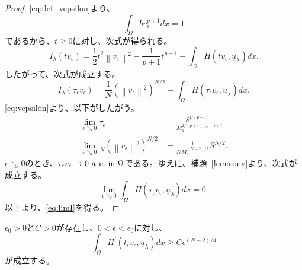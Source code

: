 \begin{proof}
 \eqref{eq:def_vepsilon}より、
 \[
  \int_\Omega bv_\epsilon^{p+1} dx = 1
 \]
 であるから、$t \geq 0$に対し、次式が得られる。
 \[
  I_\lambda(tv_\epsilon) = \frac{1}{2} t^2 \left\| v_\epsilon
 \right\|^2 - \frac{1}{p+1} t^{p+1} - \int_\Omega H(tv_\epsilon,
 \underline{u}_\lambda) dx.
 \]
 したがって、次式が成立する。
 \[
  I_\lambda(\tau_\epsilon v_\epsilon) = \frac{1}{N} \left( \left\|
 v_\epsilon \right\|^2 \right)^{N/2} - \int_\Omega H(\tau_\epsilon
 v_\epsilon, \underline{u}_\lambda) dx.
 \]
 \eqref{eq:vepsilon}より、以下がしたがう。
 \begin{align*}
  \lim_{\epsilon \searrow 0} \tau_\epsilon
  &= \frac{S^{1/(p-1)}}{M_1^{2/(p+1)(p-1)}}, \\
  \lim_{\epsilon \searrow 0} \frac{1}{N} \left( \left\|
 v_\epsilon \right\|^2 \right)^{N/2} &= \frac{1}{NM_1^{(N-2)/2}}
  S^{N/2}.
 \end{align*}
 $\epsilon \searrow 0$のとき、$\tau_\epsilon v_\epsilon \to 0 ~\text{a.\,e.}~
 \text{in}~ \Omega$である。ゆえに、補題~\ref{lem:conv}より、次式が成立する。
 \[
  \lim_{\epsilon \searrow 0} \int_\Omega H(\tau_\epsilon
 v_\epsilon, \underline{u}_\lambda) dx = 0.
 \]
 以上より、\eqref{eq:limI}を得る。\qedhere
\end{proof}

\begin{lem} \label{lem:intHprime}
 $\epsilon_0 > 0$と$C > 0$が存在し、$0 < \epsilon < \epsilon_0$に対し、
 \begin{equation}
  \int_\Omega H^\prime(t_\epsilon v_\epsilon, \underline{u}_\lambda)
   dx \geq C\epsilon^{(N-2)/4} \label{eq:int_Hprime}
 \end{equation}
 が成立する。
\end{lem}

